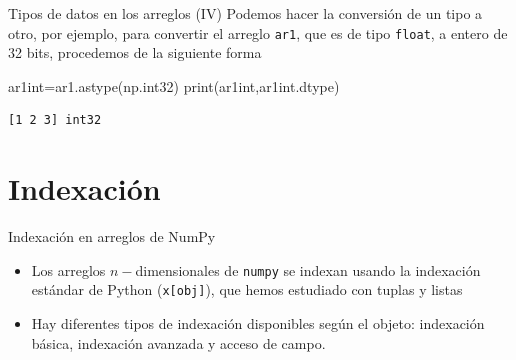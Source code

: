 \documentclass[
  ignorenonframetext,
  aspectratio=169,
  spanish,
]{beamer}
\newenvironment{Shaded}{\begin{snugshade}}{\end{snugshade}}
\newcommand{\BuiltInTok}[1]{\textcolor[rgb]{0.00,0.23,0.31}{#1}}
\newcommand{\NormalTok}[1]{\textcolor[rgb]{0.00,0.23,0.31}{#1}}
\newcommand{\OperatorTok}[1]{\textcolor[rgb]{0.37,0.37,0.37}{#1}}
\begin{document}
\begin{frame}[fragile]{Tipos de datos en los arreglos (IV)}
\label{tipos-de-datos-en-los-arreglos-iv}
Podemos hacer la conversión de un tipo a otro, por ejemplo, para
convertir el arreglo \texttt{ar1}, que es de tipo \texttt{float}, a
entero de 32 bits, procedemos de la siguiente forma

\begin{Shaded}
\begin{Highlighting}[]
\NormalTok{ar1int}\OperatorTok{=}\NormalTok{ar1.astype(np.int32)}
\BuiltInTok{print}\NormalTok{(ar1int,ar1int.dtype)}
\end{Highlighting}
\end{Shaded}

\begin{verbatim}
[1 2 3] int32
\end{verbatim}
\end{frame}

\section{Indexación}\label{indexaciuxf3n}

\begin{frame}[fragile]{Indexación en arreglos de NumPy}
\label{sec-indexacionNumpy}

\begin{itemize}
\item
  Los arreglos \(n-\)dimensionales de \texttt{numpy} se indexan usando
  la indexación estándar de Python (\texttt{x{[}obj{]}}), que hemos
  estudiado con tuplas y listas
\item
  Hay diferentes tipos de indexación disponibles según el objeto:
  indexación básica, indexación avanzada y acceso de campo.
\end{itemize}
\end{frame}
\end{document}

